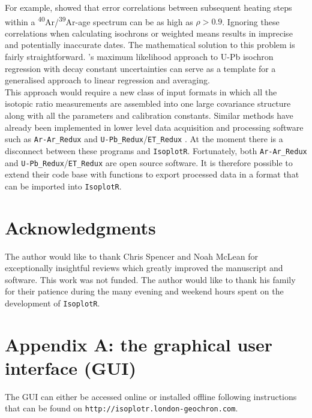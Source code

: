 \documentclass{article}
\begin{document}
For example, \citet{vermeesch2015b} showed that error correlations
between subsequent heating steps within a
\textsuperscript{40}Ar/\textsuperscript{39}Ar-age spectrum can be as
high as $\rho > 0.9$. Ignoring these correlations when calculating
isochrons or weighted means results in imprecise and potentially
inaccurate dates. The mathematical solution to this problem is fairly
straightforward. \citet{ludwig1998}'s maximum likelihood approach to
U-Pb isochron regression with decay constant uncertainties can serve
as a template for a generalised approach to linear regression and
averaging.\\

This approach would require a new class of input formats in which all
the isotopic ratio measurements are assembled into one large
covariance structure along with all the parameters and calibration
constants. Similar methods have already been implemented in lower
level data acquisition and processing software such as
\texttt{Ar-Ar\_Redux} \citep{vermeesch2015b} and
\texttt{U-Pb\_Redux}/\texttt{ET\_Redux} \citep{bowring2011,
  mclean2016}. At the moment there is a disconnect between these
programs and \texttt{IsoplotR}. Fortunately, both
\texttt{Ar-Ar\_Redux} and \texttt{U-Pb\_Redux}/\texttt{ET\_Redux} are
open source software. It is therefore possible to extend their code
base with functions to export processed data in a format that can be
imported into \texttt{IsoplotR}.

\section*{Acknowledgments}

The author would like to thank Chris Spencer and Noah McLean for
exceptionally insightful reviews which greatly improved the manuscript
and software.  This work was not funded. The author would like to
thank his family for their patience during the many evening and
weekend hours spent on the development of \texttt{IsoplotR}.

\clearpage

\renewcommand\thefigure{A.\arabic{figure}}    
\setcounter{figure}{0}
\section*{Appendix A: the graphical user interface (GUI)}

The GUI can either be accessed online or installed offline following
instructions that can be found on
\texttt{http://isoplotr.london-geochron.com}.
\end{document}
